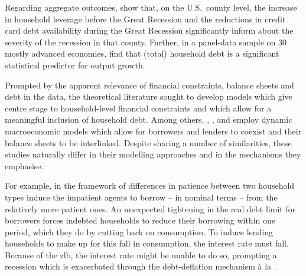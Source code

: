 \documentclass[12pt]{article} %
\numberwithin{equation}{section} %
\numberwithin{figure}{section}
\numberwithin{table}{section}
\begin{document}
Regarding aggregate outcomes, \textcite{mian2010} show that, on the U.S.~county level, the increase in household leverage before the Great Recession and the reductions in credit card debt availability during the Great Recession significantly inform about the severity of the recession in that county. Further, in a panel-data sample on 30 mostly advanced economies, \textcite{mian2017} find that (total) household debt is a significant statistical predictor for output growth.


Prompted by the apparent relevance of financial constraints, balance sheets and debt in the data, the theoretical literature sought to develop models which give centre stage to household-level financial constraints and which allow for a meaningful inclusion of household debt. Among others, \textcite{egg2012}, \textcite{riosrull2015}, \textcite{justiniano2015} and \textcite{gl2017} employ dynamic macroeconomic models which allow for borrowers and lenders to coexist and their balance sheets to be interlinked. Despite sharing a number of similarities, these studies naturally differ in their modelling approaches and in the mechanisms they emphasise.

For example, in the framework of \textcite{egg2012} differences in patience between two household types induce the impatient agents to borrow -- in nominal terms -- from the relatively more patient ones. An unexpected tightening in the real debt limit for borrowers forces indebted households to reduce their borrowing within one period, which they do by cutting back on consumption. To induce lending households to make up for this fall in consumption, the interest rate must fall. Because of the \Gls{zlb}, the interest rate might be unable to do so, prompting a recession which is exacerbated through the debt-deflation mechanism à la \textcite{fisher1933}.

\end{document}
